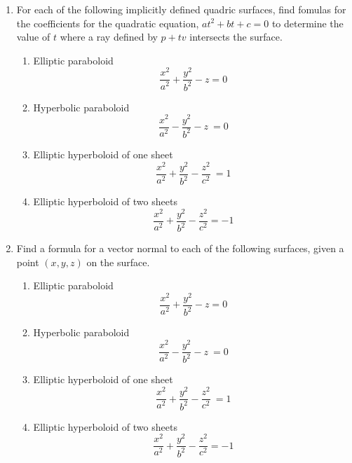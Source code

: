 \documentclass{article}
\begin{document}
\begin{enumerate}
\item For each of the following implicitly defined quadric surfaces,
  find fomulas for  the coefficients  for the quadratic equation,
  $at^2 + bt + c = 0$
  to determine the value of $t$ where a ray defined by $p + tv$
  intersects the surface. 
  \begin{enumerate}
  \item Elliptic paraboloid \[\frac{x^2}{a^2} + \frac{y^2}{b^2} - z = 0\]
  \item Hyperbolic paraboloid \[\frac{x^2}{a^2} - \frac{y^2}{b^2} - z\ = 0\]
  \item Elliptic hyperboloid of one sheet \[\frac{x^2}{a^2} + \frac{y^2}{b^2} - \frac{z^2}{c^2}\ = 1\]
  \item Elliptic hyperboloid of two sheets
    \[ \frac{x^2}{a^2} + \frac{y^2}{b^2} - \frac{z^2}{c^2} = -1\]
  \end{enumerate}
  \newpage
  
\item Find a formula for a vector normal to each of the following
  surfaces, given a point $(x,y,z)$ on the surface.
  \begin{enumerate}
  \item Elliptic paraboloid \[\frac{x^2}{a^2} + \frac{y^2}{b^2} - z = 0\]
\vfill
  \item Hyperbolic paraboloid \[\frac{x^2}{a^2} - \frac{y^2}{b^2} - z\ = 0\]
\vfill
  \item Elliptic hyperboloid of one sheet \[\frac{x^2}{a^2} + \frac{y^2}{b^2} - \frac{z^2}{c^2}\ = 1\]
\vfill
  \item Elliptic hyperboloid of two sheets
    \[ \frac{x^2}{a^2} + \frac{y^2}{b^2} - \frac{z^2}{c^2} = -1\]
  \end{enumerate}
\vfill


\end{enumerate}
\end{document}
